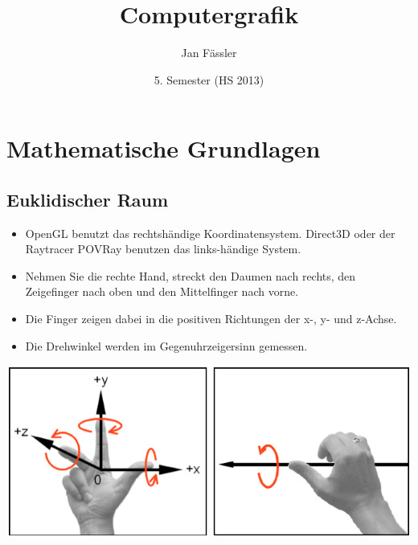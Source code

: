 \documentclass[10pt]{article}
\title{
	\vspace{5cm}
	Computergrafik
}
\author{Jan Fässler}
\date{5. Semester (HS 2013)}
\begin{document}
\maketitle
\thispagestyle{fancy}

\newpage

\tableofcontents	  	


\newpage
\setcounter{page}{1}


\section{Mathematische Grundlagen}
\subsection{Euklidischer Raum}
\begin{itemize}
	\item OpenGL benutzt das rechtshändige Koordinatensystem. Direct3D oder der Raytracer POVRay benutzen das links-händige System.
	\item Nehmen Sie die rechte Hand, streckt den Daumen nach rechts, den Zeigefinger nach oben und den Mittelfinger nach vorne.
	\item Die Finger zeigen dabei in die positiven Richtungen der x-, y- und z-Achse.
	\item Die Drehwinkel werden im Gegenuhrzeigersinn 	gemessen.
\end{itemize}
\begin{center}
	\includegraphics[scale=0.4]{euklidischer_raum.png}
\end{center}
\end{document}
